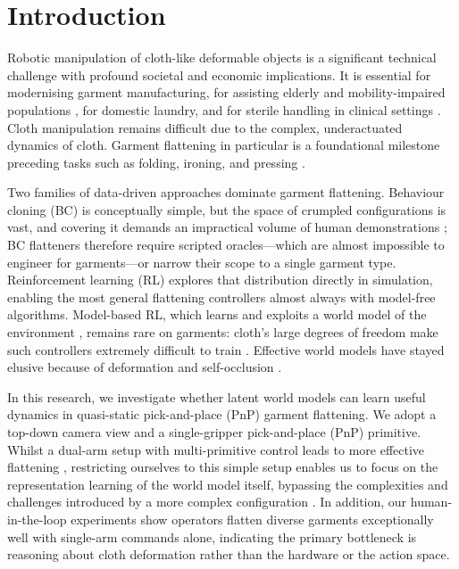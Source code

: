\documentclass[journal]{IEEEtran}
\newif\ifshowrev\showrevtrue
\newcommand{\rev}[1]{\ifshowrev\textcolor{revblue}{#1}\else#1\fi}
\newif\ifshowirev\showirevtrue
\newcommand{\irev}[1]{\ifshowirev\textcolor{irevgreen}{#1}\else#1\fi}
\newif\ifshowrrev\showrrevtrue
\newcommand{\rrev}[1]{\ifshowrrev\textcolor{rrevred}{#1}\else#1\fi}
\begin{document}
\section{Introduction} \label{sec:introduction}

Robotic manipulation of cloth-like deformable objects is a significant technical challenge with profound societal and economic implications. \rev{It is essential for modernising garment manufacturing, for assisting elderly and mobility-impaired populations \cite{WHOaged2024}, for domestic laundry, and for sterile handling in clinical settings \cite{cornish2021clinical}. Cloth manipulation remains difficult due to the complex, underactuated dynamics of cloth. Garment flattening \irev{in particular is a} foundational milestone preceding tasks such as folding, ironing, and pressing \cite{doumanoglou2016folding}.}

\rev{Two families of data-driven approaches dominate garment flattening. Behaviour cloning (BC) is conceptually simple, but the space of crumpled configurations is vast\rrev{,} and covering it demands an impractical volume of human demonstrations \cite{weng2022fabricflownet, lips2024learning, huang2025sis}; BC flatteners therefore \rrev{require} scripted oracles\rrev{---which are almost impossible to engineer for garments---}or narrow their scope to a single garment type. Reinforcement learning (RL) explores that distribution directly in simulation, enabling the most general flattening controllers \cite{matas2018sim, lin2020softgym, canberk2023cloth, gu2023learning, ha2022flingbot} almost always with model-free algorithms. Model-based RL, which learns and exploits a world model of the environment \cite{ha2018world, hafner2019learning}, remains rare on garments: cloth's large degrees of freedom make such controllers extremely difficult to train \cite{kadi2023data}. Effective world models have stayed elusive because of deformation and self-occlusion \cite{ma2021learning, yan2021learning, lin2020softgym}.}

\rev{In this research, we investigate whether latent world models can learn useful dynamics in quasi-static pick-and-place (PnP) garment flattening. We adopt a top-down camera view and a single-gripper pick-and-place (PnP) primitive. Whilst a dual-arm setup with multi-primitive control leads to more effective flattening \cite{avigal2022speedfolding}, restricting ourselves to this simple setup enables us to focus on the representation learning of the world model itself, bypassing the complexities and challenges introduced by a more complex configuration \cite{canberk2023cloth}. In addition, our human-in-the-loop experiments show operators flatten diverse garments exceptionally well with single-arm commands alone, indicating the primary bottleneck is \irev{reasoning about cloth deformation} rather than the hardware or the action space.}
\end{document}

